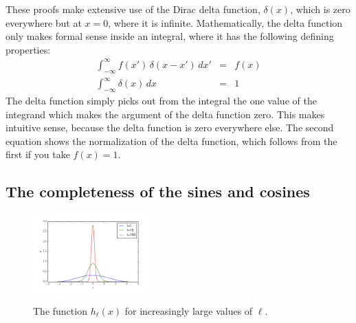\documentclass[12pt]{book}
\begin{document}
These proofs make extensive use of the Dirac delta function, $\delta(x)$, which is zero everywhere but at $x=0$, where it is infinite.  Mathematically, the delta function only makes formal sense inside an integral, where it has the following defining properties:
\begin{eqnarray}
\int_{-\infty}^{\infty} f(x') \, \delta(x-x') \, dx' &=& f(x) \\
\int_{-\infty}^{\infty} \delta(x) \, dx &=& 1 \label{eqn:norm}
 \end{eqnarray}
The delta function simply picks out from the integral the one value of the integrand which makes the argument of the delta function zero.  This makes intuitive sense, because the delta function is zero everywhere else.  The second equation shows the normalization of the delta function, which follows from the first if you take $f(x)=1$.





\subsection{The completeness of the sines and cosines}

\begin{figure}[thb]
\begin{center}
{\includegraphics[width=0.40\textwidth]{figs/hk.png}}
\end{center}
\caption{\label{fig:hl} The function $h_\ell(x)$ for increasingly large values of $\ell$.}
\end{figure}
\end{document}
